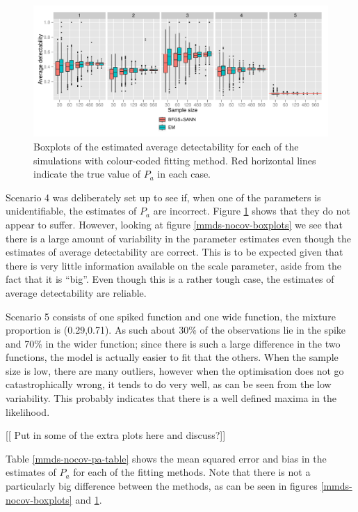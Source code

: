 \begin{figure}
\centering
\includegraphics[width=6in]{mix/figs/nocov-pa-boxplots.pdf}
\caption{Boxplots of the estimated average detectability for each of the simulations with colour-coded fitting method. Red horizontal lines indicate the true value of $P_a$ in each case.}
\label{mmds-nocov-pa-boxplots}
\end{figure}

Scenario 4 was deliberately set up to see if, when one of the parameters is unidentifiable, the estimates of $P_a$ are incorrect. Figure \ref{mmds-nocov-pa-boxplots} shows that they do not appear to suffer. However, looking at figure \ref{mmds-nocov-boxplots} we see that there is a large amount of variability in the parameter estimates even though the estimates of average detectability are correct. This is to be expected given that there is very little information available on the scale parameter, aside from the fact that it is ``big''. Even though this is a rather tough case, the estimates of average detectability are reliable. 

Scenario 5 consists of one spiked function and one wide function, the mixture proportion is (0.29,0.71). As such about 30\% of the observations lie in the spike and 70\% in the wider function; since there is such a large difference in the two functions, the model is actually easier to fit that the others. When the sample size is low, there are many outliers, however when the optimisation does not go catastrophically wrong, it tends to do very well, as can be seen from the low variability. This probably indicates that there is a well defined maxima in the likelihood.

[[ Put in some of the extra plots here and discuss?]]


Table \ref{mmds-nocov-pa-table} shows the mean squared error and bias in the estimates of $P_a$ for each of the fitting methods. Note that there is not a particularly big difference between the methods, as can be seen in figures \ref{mmds-nocov-boxplots} and \ref{mmds-nocov-pa-boxplots}.

